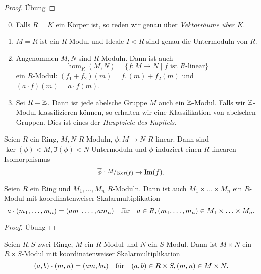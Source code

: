 \begin{proof}
	Übung
\end{proof}

\begin{eg}
	\begin{enumerate}
		\setcounter{enumi}{-1}
		\item Falls $R = K$ ein Körper ist, so reden wir genau über \emph{Vektorräume über $K$}.
		\item $M = R$ ist ein $R$-Modul und Ideale $I < R$ sind genau die Untermoduln von $R$.
		\item Angenommen $M,N$ sind $R$-Moduln. Dann ist auch
			\[
				\hom_{R}(M,N) = \{f: M \to N \mid f \text{ ist $R$-linear}\} 
			\]
			ein $R$-Modul: $(f_1+f_2)(m) = f_1(m) + f_2(m)$ und $(a\cdot f)(m) = a \cdot f(m)$.
		\item Sei $R = \mathbb{Z}$. Dann ist jede abelsche Gruppe $M$ auch ein $\mathbb{Z}$-Modul.
			Falls wir $\mathbb{Z}$-Modul klassifizieren können, so erhalten wir eine Klassifikation von abelschen Gruppen.
			Dies ist eines der \emph{Hauptziele des Kapitels}.
	\end{enumerate}
\end{eg}

\begin{proposition}
	Seien $R$ ein Ring, $M,N$ $R$-Moduln, $\phi: M \to N$ $R$-linear.
	Dann sind $\ker(\phi) < M, \Im(\phi) < N$ Untermoduln und $\phi$ induziert einen $R$-linearen Isomorphismus
	\[
		\overline{\phi}: \sfrac{M}{\operatorname{Ker}(f)} \to \Im(f)
	.\] 
\end{proposition}

\begin{lemma}
	Seien $R$ ein Ring und $M_1,\ldots,M_{n}$ $R$-Moduln.
	Dann ist auch $M_1 \times \ldots \times M_{n}$ ein $R$-Modul mit koordinatenweiser Skalarmultiplikation
	\[
		a \cdot (m_1,\ldots,m_{n}) = (a m_1,\ldots,a m_{n}) \qq{für} a \in R, (m_1,\ldots,m_{n}) \in M_1 \times \ldots \times M_{n}
	.\] 
\end{lemma}

\begin{proof}
	Übung
\end{proof}

\begin{lemma}
	Seien $R,S$ zwei Ringe, $M$ ein $R$-Modul und $N$ ein $S$-Modul.
	Dann ist $M \times N$ ein $R \times S$-Modul mit koordinatenweiser Skalarmultiplikation
	\[
		(a,b) \cdot (m,n) = (a m, b n) \qq{für} (a,b) \in R \times S, (m,n) \in M \times N
	.\] 
\end{lemma}

